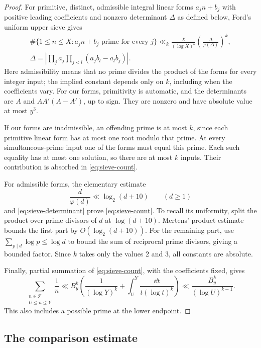 \begin{proof}
For primitive, distinct, admissible integral linear forms
$a_jn+b_j$ with positive leading coefficients and nonzero determinant
$\Delta$ as defined below, Ford's uniform upper sieve
\cite[Theorem~2.5]{FordSieve2023} gives
\begin{equation}\label{eq:sieve-determinant}
 \begin{gathered}
 \#\{1\le n\le X:a_jn+b_j\text{ prime for every }j\}
 \ll_k\frac{X}{(\log X)^k}
 \left(\frac{\Delta}{\varphi(\Delta)}\right)^k,\\
 \Delta=\left|\prod_j a_j
       \prod_{j<l}(a_jb_l-a_lb_j)\right|.
 \end{gathered}
\end{equation}
Here admissibility means that no prime divides the product of the
forms for every integer input; the implied constant depends only
on $k$, including when the coefficients vary.  For our forms,
primitivity is automatic, and the determinants are $A$ and
$AA'(A-A')$, up to sign.  They are nonzero and have absolute value at
most $y^3$.

If our forms are inadmissible, an offending prime is at most $k$, since
each primitive linear form has at most one root modulo that prime.
At every simultaneous-prime input one of the forms must equal this
prime.  Each such equality has at most one solution, so there are at
most $k$ inputs.  Their contribution is absorbed in
\eqref{eq:sieve-count}.

For admissible forms, the elementary estimate
\[
 \frac{d}{\varphi(d)}\ll\log_2(d+10)\qquad(d\ge1)
\]
and \eqref{eq:sieve-determinant} prove \eqref{eq:sieve-count}.
To recall its uniformity, split the product over prime divisors of
$d$ at $\log(d+10)$.  Mertens' product estimate bounds the first part
by $O(\log_2(d+10))$.  For the remaining part, use
$\sum_{p\mid d}\log p\le\log d$ to bound the sum of reciprocal
prime divisors, giving a bounded factor.  Since $k$ takes only the
values $2$ and $3$, all constants are absolute.

Finally, partial summation of \eqref{eq:sieve-count}, with the
coefficients fixed, gives
\[
 \sum_{\substack{n\in\mathcal P\\U\le n\le Y}}\frac1n
 \ll B_y^k\left(\frac1{(\log Y)^k}
       +\int_U^Y\frac{\dd t}{t(\log t)^k}\right)
 \ll\frac{B_y^k}{(\log U)^{k-1}}.
\]
This also includes a possible prime at the lower endpoint.
\end{proof}

\subsection{The comparison estimate}


